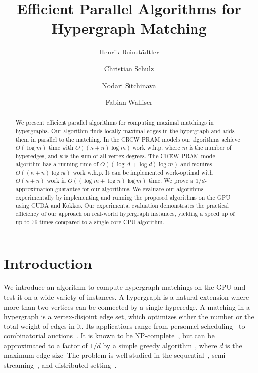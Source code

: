 \documentclass[runningheads]{llncs}
\begin{document}
\title{Efficient Parallel Algorithms for Hypergraph Matching}
\author{Henrik Reinstädtler \and
Christian Schulz \and
Nodari Sitchinava\and 
Fabian Walliser }
\maketitle              %
\begin{abstract}
        We present efficient parallel algorithms for computing maximal matchings in hypergraphs. Our algorithm finds locally maximal edges in the hypergraph and adds them in parallel to the matching. In the CRCW PRAM models our algorithms achieve $O(\log{m})$ time with $O((\kappa + n) \log {m})$ work w.h.p.
        where $m$ is the number of hyperedges, 
        and $\kappa$ is the sum of all vertex degrees. The CREW PRAM model algorithm has a running time of $O((\log{\Delta}+\log{d})\log{m})$ and requires $O((\kappa + n) \log {m})$ work w.h.p. It can be implemented work-optimal with $O(\kappa +n)$ work in $O((\log{m}+\log{n})\log{m})$ time.
        We prove a~$1/d$-approximation guarantee for our algorithms.
        We evaluate our algorithms experimentally by implementing and running the proposed algorithms on the GPU using CUDA and Kokkos. Our experimental evaluation demonstrates the practical efficiency of our approach on real-world hypergraph instances, yielding a speed up of up to 76 times compared to a single-core CPU algorithm.
\end{abstract}
\section{Introduction}
We introduce an algorithm to compute hypergraph matchings on the GPU and test it on a wide variety of instances.
A hypergraph is a natural extension where more than two vertices can be connected by a single hyperedge. 
A matching in a hypergraph is a vertex-disjoint edge set, which  optimizes either the number or the total weight of edges in it.
Its applications range from personnel scheduling~\cite{froger2015set} to combinatorial auctions~\cite{gottlob2013decomposing}.
It is known to be NP-complete~\cite{approxresult}, but can be approximated to a factor of $1/d$ by a simple greedy algorithm~\cite{Besser+:Greedy,Korte+:Greedy}, where $d$ is the maximum edge size. 
The problem is well studied in the sequential~\cite{dufosse2019effective}, semi-streaming~\cite{reinstadtler2025semi}, and distributed setting~\cite{hanguir2021distributed}. 
\end{document}
